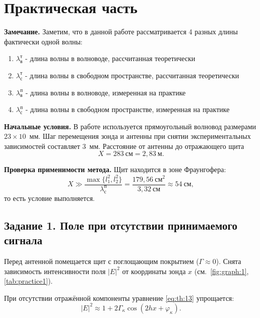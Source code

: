 \section{Практическая часть}
\noindent\textbf{Замечание.}
Заметим, что в данной работе рассматривается 4 разных длины фактически одной волны:
\begin{enumerate}
	\item $\lambda^{\text{т}}_{\text{в}}$ - длина волны в волноводе, рассчитанная теоретически
	\item $\lambda^{\text{т}}_{\text{с}}$ - длина волны в свободном пространстве, рассчитанная теоретически
	\item $\lambda^{\text{п}}_{\text{в}}$ - длина волны в волноводе, измеренная на практике
	\item $\lambda^{\text{п}}_{\text{с}}$ - длина волны в свободном пространстве, измеренная на практике
\end{enumerate}


\noindent\textbf{Начальные условия.}
В работе используется прямоугольный волновод размерами $23 \times 10$~мм. Шаг перемещения зонда и антенны при снятии экспериментальных зависимостей составляет $3$~мм. Расстояние от антенны до отражающего щита
\begin{equation}
	X = 283~\text{см} = 2{,}83~\text{м}.
\end{equation}

\noindent\textbf{Проверка применимости метода.}
Щит находится в зоне Фраунгофера:
\begin{equation}
	X \gg \frac{\max\{l_1^2, l_2^2\}}{{\lambda^{\text{п}}_{\text{с}}}}
	= \frac{179{,}56~\text{см}^2}{3{,}32~\text{см}}
	\approx 54~\text{см},
\end{equation}
то есть условие выполняется.

\subsection{Задание 1. Поле при отсутствии принимаемого сигнала}

Перед антенной помещается щит с поглощающим покрытием ($\Gamma \approx 0$). Снята зависимость интенсивности поля $|E|^2$ от координаты зонда $x$ (см.~\cref{fig:graph:1}, \cref{tab:practice1}).

При отсутствии отражённой компоненты уравнение \cref{eq:th:13} упрощается:
\begin{equation}
	|E|^2 \approx 1 + 2\Gamma_\kappa \cos(2hx + \varphi_\kappa).
	\label{eq:pr:1.1}
\end{equation}

